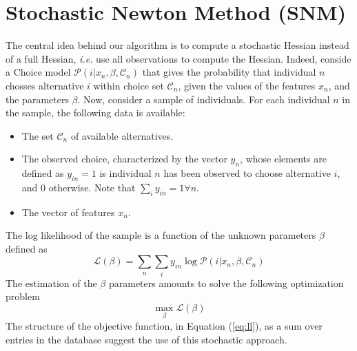 \documentclass[conference]{IEEEtran}
\begin{document}
\section{Stochastic Newton Method (SNM)}
\label{sec:snm}

The central idea behind our algorithm is to compute a stochastic Hessian instead of a full Hessian, {\it i.e.} use all observations to compute the Hessian. Indeed, conside a Choice model $\mathcal{P}(i|x_n, \beta, \mathcal{C}_n)$ that gives the probability that individual $n$ chosses alternative $i$ within choice set $\mathcal{C}_n$, given the values of the features $x_n$, and the parameters $\beta$. Now, consider a sample of individuals. For each individual $n$ in the sample, the following data is available:
\begin{itemize}
\item The set $\mathcal{C}_n$ of available alternatives.
\item The observed choice, characterized by the vector $y_n$, whose elements are defined as $y_{in}=1$ is individual $n$ has been observed to choose alternative $i$, and 0 otherwise. Note that $\sum_{i} y_{in} = 1 \forall n$.
\item The vector of features $x_n$.
\end{itemize}
The log likelihood of the sample is a function of the unknown parameters $\beta$ defined as 
\begin{equation}
\label{eq:ll}
\mathcal{L}(\beta) = \sum_n \sum_i y_{in} \log \mathcal{P}(i|x_n, \beta, \mathcal{C}_n)
\end{equation}
The estimation of the $\beta$ parameters amounts to solve the following optimization problem
\begin{equation}
\label{eq:opt}
\max_{\beta} \mathcal{L}(\beta)
\end{equation} 
The structure of the objective function, in Equation (\ref{eq:ll}), as a sum over entries in the database suggest the use of this stochastic approach.
\end{document}
